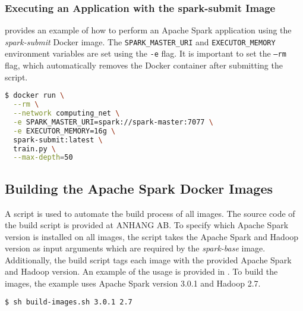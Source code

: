 \subsubsection{Executing an Application with the spark-submit Image}
% 
 provides an example of how to perform an Apache Spark application using the \textit{spark-submit} Docker image.
The \texttt{SPARK\_MASTER\_URI} and \texttt{EXECUTOR\_MEMORY} environment variables are set using the \texttt{-e} flag.
%
It is important to set the \texttt{--rm} flag, which automatically removes the Docker container after submitting the script.
\begin{lstlisting}[label=lst:06_env_depl_submit_example, caption=Example of the spark-submit image, language=bash, numbers=none]
$ docker run \
  --rm \
  --network computing_net \
  -e SPARK_MASTER_URI=spark://spark-master:7077 \
  -e EXECUTOR_MEMORY=16g \
  spark-submit:latest \
  train.py \
  --max-depth=50
\end{lstlisting}


\subsection{Building the Apache Spark Docker Images}
\label{subsec:07_spark_building-images}
A script is used to automate the build process of all images.
The source code of the build script is provided at ANHANG AB.
To specify which Apache Spark version is installed on all images, the script takes the Apache Spark and Hadoop version as input arguments which are required by the \textit{spark-base} image.
Additionally, the build script tags each image with the provided Apache Spark and Hadoop version.
An example of the usage is provided in .
To build the images, the example uses Apache Spark version 3.0.1 and Hadoop 2.7.
\begin{lstlisting}[label=lst:06_env_depl_build_example, caption=Example of the spark-submit image, language=bash, numbers=none]
$ sh build-images.sh 3.0.1 2.7
\end{lstlisting}


